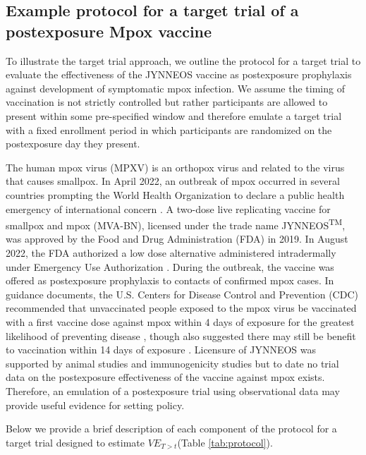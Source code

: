 \documentclass[11pt]{article}
\begin{document}
\subsection{Example protocol for a target trial of a postexposure Mpox vaccine}

To illustrate the target trial approach, we outline the protocol for a target trial to evaluate the effectiveness of the JYNNEOS vaccine as postexposure prophylaxis against development of symptomatic mpox infection. We assume the timing of vaccination is not strictly controlled but rather participants are allowed to present within some pre-specified window and therefore emulate a target trial with a fixed enrollment period in which participants are randomized on the postexposure day they present.

The human mpox virus (MPXV) is an orthopox virus and related to the virus that causes smallpox. In April 2022, an outbreak of mpox occurred in several countries prompting the World Health Organization to declare a public health emergency of international concern \cite{nuzzo_who_2022}. A two-dose live replicating vaccine for smallpox and mpox (MVA-BN), licensed under the trade name JYNNEOS\textsuperscript{TM}, was approved by the Food and Drug Administration (FDA) in 2019. In August 2022, the FDA authorized a low dose alternative administered intradermally under Emergency Use Authorization \cite{united_states_food_and_drug_administration_monkeypox_2022}. During the outbreak, the vaccine was offered as postexposure prophylaxis to contacts of confirmed mpox cases. In guidance documents, the U.S. Centers for Disease Control and Prevention (CDC) recommended that unvaccinated people exposed to the mpox virus be vaccinated with a first vaccine dose against mpox within 4 days of exposure for the greatest likelihood of preventing disease \cite{cdc_mpox_2023-1}, though also suggested there may still be benefit to vaccination within 14 days of exposure \cite{kecmanovic1975einfluss,sommer_1972_1974}. Licensure of JYNNEOS was supported by animal studies \cite{earl_rapid_2008,keckler_effects_2013,hatch_assessment_2013,samuelsson_survival_2008} and immunogenicity studies \cite{pittman_phase_2019} but to date no trial data on the postexposure effectiveness of the vaccine against mpox exists. Therefore, an emulation of a postexposure trial using observational data may provide useful evidence for setting policy.

Below we provide a brief description of each component of the protocol for a target trial designed to estimate $VE_{T>t}$(Table \ref{tab:protocol}).
\end{document}
